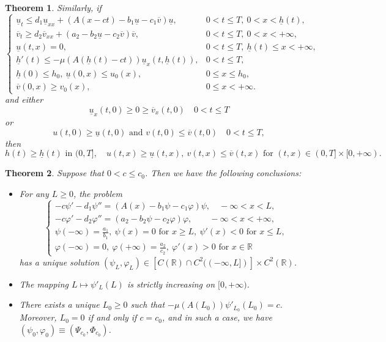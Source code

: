 \documentclass[10pt,a4paper]{amsart}
\newtheorem{theorem}{Theorem}
\begin{document}
\begin{theorem}
		Similarly, if
		\[
		\begin{cases}
			\underline{u}_t \le d_1\underline{u}_{xx}
			+ (A(x - ct) - b_1\underline{u} - c_1 \overline{v}) \underline{u},
			& 0 < t \le T,~ 0 < x < \underline{h}(t), \\
			\overline{v}_t \ge d_2\overline{v}_{xx}
			+ (a_2 - b_2\underline{u} - c_2\overline{v})\overline{v},
			& 0 < t \le T,~ 0 < x < +\infty, \\
			\underline{u}(t, x) = 0,
			& 0 < t \le T, ~ \underline{h}(t) \leq x < +\infty, \\
			\underline{h}'(t) \le -\mu (A(\underline{h}(t) - ct))\underline{u}_x(t, \underline{h}(t)),
			& 0 < t \le T, \\
			\underline{h}(0) \le h_0,~ \underline{u}(0, x) \le u_0(x),
			& 0 \leq x \leq h_0, \\
			\overline{v}(0, x) \ge v_0(x),
			& 0 \le x < +\infty.
		\end{cases}
		\]		
		and either
		\[
		\underline{u}_x(t, 0) \ge 0 \ge \overline{v}_x(t, 0) \quad 0 < t \le T
		\]
		or
		\[
		u(t,0) \ge \underline{u}(t,0) \text{ and } v(t,0) \le \overline{v}(t,0)  \quad 0 < t \le T,
		\]
		then
		\[
		h(t) \ge \underline{h}(t) \text{ in } (0,T],\quad
		u(t,x) \ge \underline{u}(t,x),~ v(t,x) \le \overline{v}(t,x)
		\text{ for } (t,x) \in (0,T] \times [0,+\infty).
		\]
	\end{theorem}

	\begin{theorem}\label{th:semi-wave} Suppose that $0<c\le c_0$. Then we have the following conclusions:
		\begin{itemize}
			\item[(i)] For any $L\ge0$, the problem
			\begin{equation}\label{semi-wave}
				\begin{cases}
					-c \psi' - d_1 \psi'' = (A(x) - b_1\psi - c_1\varphi)\psi, \quad-\infty < x < L,\\
					-c \varphi' - d_2 \varphi'' = (a_2 - b_2\psi - c_2\varphi)\varphi, \qquad -\infty < x < +\infty,\\
					\psi(-\infty) = \frac{a_1}{b_1}, ~ \psi(x)=0 \text{ for } x\ge L, ~ \psi'(x)<0 \text{ for } x\le L,\\	
					\varphi(-\infty) = 0, ~ \varphi(+\infty)=\frac{a_2}{c_2}, ~ \varphi'(x)>0 \text{ for } x\in\mathbb{R}
				\end{cases}			
			\end{equation}
			has a unique solution $(\psi_L,\varphi_L) \in [C(\mathbb{R})\cap C^2((-\infty, L])] \times C^2(\mathbb{R})$.
			\item[(ii)] The mapping $L \mapsto \psi'_L(L)$ is strictly increasing on $[0, +\infty)$.
			\item[(iii)] There exists a unique $L_0 \geq 0$ such that $-\mu(A(L_0))\psi'_{L_0}(L_0) = c$. Moreover, $L_0 = 0$ if and only if $c = c_0$, and in such a case, we have $(\psi_0,\varphi_0) \equiv (\Psi_{c_0}, \Phi_{c_0})$.
		\end{itemize}
	\end{theorem}
\end{document}
